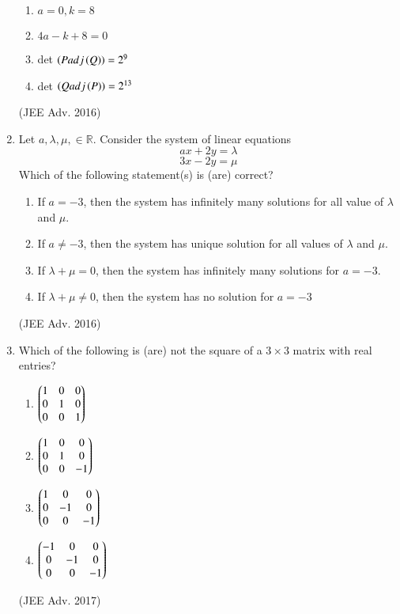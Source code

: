 \documentclass[journal,12pt,twocolumn]{IEEEtran}
\theoremstyle{remark}
\begin{document}
\begin{enumerate}
					\begin{enumerate}
						\item $a=0, k=8$
						\item $4a-k+8=0$
						\item det $\left(P adj \left(Q\right)\right) = 2^9$
						\item det $\left(Q adj \left(P\right)\right) = 2^{13}$
					\end{enumerate}
					\hfill (JEE Adv. 2016)
				\item
					Let $a, \lambda, \mu, \in \mathbb{R}$. Consider the system of linear equations $$ax+2y=\lambda$$ $$3x-2y=\mu$$ Which of the following statement(s) is (are) correct?
					\begin{enumerate}
						\item If $a=-3$, then the system has infinitely many solutions for all value of $\lambda$ and $\mu$.
						\item If $a \neq -3$, then the system has unique solution for all values of $\lambda$ and $\mu$.
						\item If $\lambda + \mu = 0$, then the system has infinitely many solutions for $a = -3$.
						\item If $\lambda + \mu \neq 0$, then the system has no solution for $a = -3$
					\end{enumerate}
					\hfill (JEE Adv. 2016)
				\item 
					Which of the following is (are) not the square of a $3 \times 3$ matrix with real entries?
						\begin{enumerate}
							\itemsep0.4em
							\item 
								$\begin{pmatrix}
									1&0&0\\
									0&1&0\\
									0&0&1
								\end{pmatrix}$\\
							\item 
								$\begin{pmatrix}
									1&0&0\\
									0&1&0\\
									0&0&-1
								\end{pmatrix}$\\
							\item 
								$\begin{pmatrix}
									1&0&0\\
									0&-1&0\\
									0&0&-1
								\end{pmatrix}$\\
							\item 
								$\begin{pmatrix}
									-1&0&0\\
									0&-1&0\\
									0&0&-1
								\end{pmatrix}$\\
						\end{enumerate}
						\hfill (JEE Adv. 2017)	
			\end{enumerate}
\end{document}
